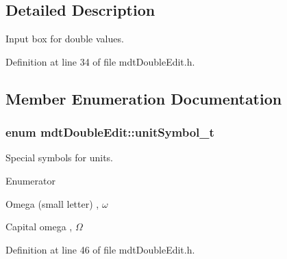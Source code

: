 \subsection{Detailed Description}
Input box for double values. 

Definition at line 34 of file mdt\-Double\-Edit.\-h.



\subsection{Member Enumeration Documentation}
\hypertarget{classmdt_double_edit_a6e94cba2a7b3fcc16b70475c2cefd8cf}{
\subsubsection[{unit\-Symbol\-\_\-t}]{\setlength{\rightskip}{0pt plus 5cm}enum {\bf mdt\-Double\-Edit\-::unit\-Symbol\-\_\-t}}}\label{classmdt_double_edit_a6e94cba2a7b3fcc16b70475c2cefd8cf}


Special symbols for units. 

\begin{Desc}
\item[Enumerator]\par
\begin{description}
\item[{\em 
\hypertarget{classmdt_double_edit_a6e94cba2a7b3fcc16b70475c2cefd8cfaaeecc523af2a2eba97a3b1a38f4518c5}{omega}\label{classmdt_double_edit_a6e94cba2a7b3fcc16b70475c2cefd8cfaaeecc523af2a2eba97a3b1a38f4518c5}
}]Omega (small letter) , {$\omega$} \item[{\em 
\hypertarget{classmdt_double_edit_a6e94cba2a7b3fcc16b70475c2cefd8cfadad86fae09055324dd22fc15e6107fe0}{Omega\-Capital}\label{classmdt_double_edit_a6e94cba2a7b3fcc16b70475c2cefd8cfadad86fae09055324dd22fc15e6107fe0}
}]Capital omega , {$\Omega$} \end{description}
\end{Desc}


Definition at line 46 of file mdt\-Double\-Edit.\-h.



